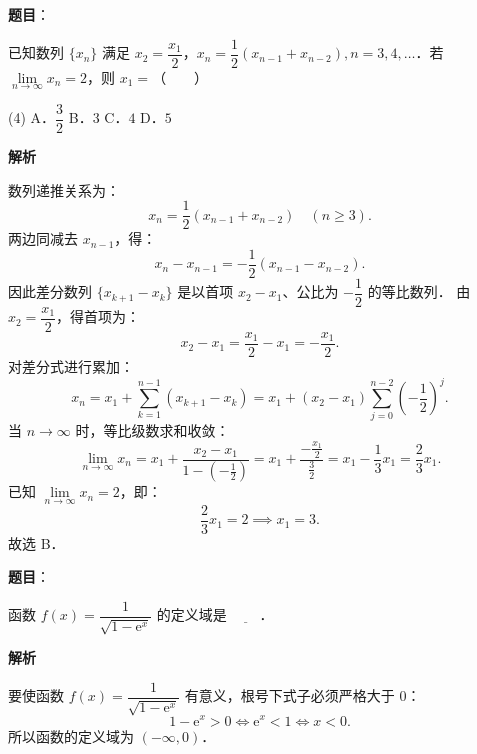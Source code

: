 \begin{answer}

\textbf{题目}：

已知数列 $\{x_n\}$ 满足 $x_2 = \dfrac{x_1}{2}$，$x_n = \dfrac{1}{2}(x_{n-1} + x_{n-2}), n = 3, 4, \dots$．若 $\lim\limits_{n\to\infty} x_n = 2$，则 $x_1 =$\mbox{（　　）}

\begin{gkopts}(4)
\task A．$\dfrac{3}{2}$
\task B．$3$
\task C．$4$
\task D．$5$
\end{gkopts}

\textbf{解析}

数列递推关系为：
\nopagebreak[4]
\[
x_n = \frac{1}{2}(x_{n-1} + x_{n-2}) \quad (n \geqslant 3).
\]
两边同减去 $x_{n-1}$，得：
\nopagebreak[4]
\[
x_n - x_{n-1} = -\frac{1}{2}(x_{n-1} - x_{n-2}).
\]
因此差分数列 $\{x_{k+1} - x_k\}$ 是以首项 $x_2 - x_1$、公比为 $-\dfrac{1}{2}$ 的等比数列．
由 $x_2 = \dfrac{x_1}{2}$，得首项为：
\nopagebreak[4]
\[
x_2 - x_1 = \frac{x_1}{2} - x_1 = -\frac{x_1}{2}.
\]
对差分式进行累加：
\nopagebreak[4]
\[
x_n = x_1 + \sum_{k=1}^{n-1} (x_{k+1} - x_k) = x_1 + (x_2 - x_1) \sum_{j=0}^{n-2} \left(-\frac{1}{2}\right)^j.
\]
当 $n \to \infty$ 时，等比级数求和收敛：
\nopagebreak[4]
\[
\lim_{n\to\infty} x_n = x_1 + \frac{x_2 - x_1}{1 - \left(-\frac{1}{2}\right)} = x_1 + \frac{-\frac{x_1}{2}}{\frac{3}{2}} = x_1 - \frac{1}{3}x_1 = \frac{2}{3}x_1.
\]
已知 $\lim\limits_{n\to\infty} x_n = 2$，即：
\nopagebreak[4]
\[
\frac{2}{3}x_1 = 2 \implies x_1 = 3.
\]
故选 B．


\end{answer}
\begin{answer}

\textbf{题目}：

函数 $f(x) = \dfrac{1}{\sqrt{1 - \mathrm{e}^x}}$ 的定义域是 $\underline{\qquad}$．

\textbf{解析}

要使函数 $f(x) = \dfrac{1}{\sqrt{1 - \mathrm{e}^x}}$ 有意义，根号下式子必须严格大于 0：
\nopagebreak[4]
\[
1 - \mathrm{e}^x > 0 \iff \mathrm{e}^x < 1 \iff x < 0.
\]
所以函数的定义域为 $(-\infty, 0)$．


\end{answer}
